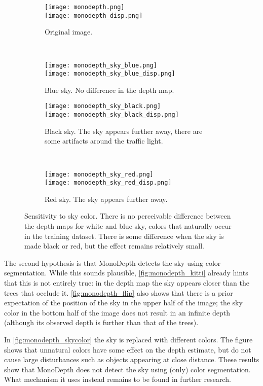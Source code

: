 \medskip

\begin{figure}
\centering
\begin{subfigure}[t]{0.45\textwidth}
\texttt{[image: monodepth.png]}\\
\texttt{[image: monodepth\_disp.png]}
\caption{Original image.}
\end{subfigure}
~
\begin{subfigure}[t]{0.45\textwidth}
\texttt{[image: monodepth\_sky\_blue.png]}\\
\texttt{[image: monodepth\_sky\_blue\_disp.png]}
\caption{Blue sky. No difference in the depth map.}
\end{subfigure}

\begin{subfigure}[t]{0.45\textwidth}
\texttt{[image: monodepth\_sky\_black.png]}\\
\texttt{[image: monodepth\_sky\_black\_disp.png]}
\caption{Black sky. The sky appears further away, there are some artifacts around the traffic light.}
\end{subfigure}
~
\begin{subfigure}[t]{0.45\textwidth}
\texttt{[image: monodepth\_sky\_red.png]}\\
\texttt{[image: monodepth\_sky\_red\_disp.png]}
\caption{Red sky. The sky appears further away.}
\end{subfigure}
\caption{Sensitivity to sky color. There is no perceivable difference between the depth maps for white and blue sky, colors that naturally occur in the training dataset. There is some difference when the sky is made black or red, but the effect remains relatively small.}
\label{fig:monodepth_skycolor}
\end{figure}

The second hypothesis is that MonoDepth detects the sky using color segmentation.
While this sounds plausible, \autoref{fig:monodepth_kitti} already hints that this is not entirely true: in the depth map the sky appears closer than the trees that occlude it.
\autoref{fig:monodepth_flip} also shows that there is a prior expectation of the position of the sky in the upper half of the image; the sky color in the bottom half of the image does not result in an infinite depth (although its observed depth is further than that of the trees).

In \autoref{fig:monodepth_skycolor} the sky is replaced with different colors.
The figure shows that unnatural colors have some effect on the depth estimate, but do not cause large disturbances such as objects appearing at close distance.
These results show that MonoDepth does not detect the sky using (only) color segmentation.
What mechanism it uses instead remains to be found in further research.

